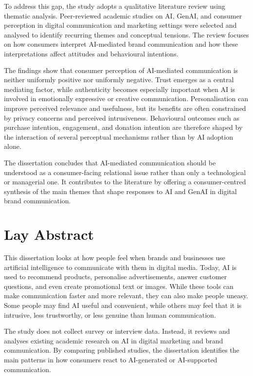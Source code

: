 \documentclass[a4paper,oneside,12pt]{book}
\numberwithin{equation}{chapter} %
\begin{document}
To address this gap, the study adopts a qualitative literature review using thematic analysis. Peer-reviewed academic studies on AI, GenAI, and consumer perception in digital communication and marketing settings were selected and analysed to identify recurring themes and conceptual tensions. The review focuses on how consumers interpret AI-mediated brand communication and how these interpretations affect attitudes and behavioural intentions.

The findings show that consumer perception of AI-mediated communication is neither uniformly positive nor uniformly negative. Trust emerges as a central mediating factor, while authenticity becomes especially important when AI is involved in emotionally expressive or creative communication. Personalisation can improve perceived relevance and usefulness, but its benefits are often constrained by privacy concerns and perceived intrusiveness. Behavioural outcomes such as purchase intention, engagement, and donation intention are therefore shaped by the interaction of several perceptual mechanisms rather than by AI adoption alone.

The dissertation concludes that AI-mediated communication should be understood as a consumer-facing relational issue rather than only a technological or managerial one. It contributes to the literature by offering a consumer-centred synthesis of the main themes that shape responses to AI and GenAI in digital brand communication.

\chapter*{Lay Abstract}
This dissertation looks at how people feel when brands and businesses use artificial intelligence to communicate with them in digital media. Today, AI is used to recommend products, personalise advertisements, answer customer questions, and even create promotional text or images. While these tools can make communication faster and more relevant, they can also make people uneasy. Some people may find AI useful and convenient, while others may feel that it is intrusive, less trustworthy, or less genuine than human communication.

The study does not collect survey or interview data. Instead, it reviews and analyses existing academic research on AI in digital marketing and brand communication. By comparing published studies, the dissertation identifies the main patterns in how consumers react to AI-generated or AI-supported communication.
\end{document}
